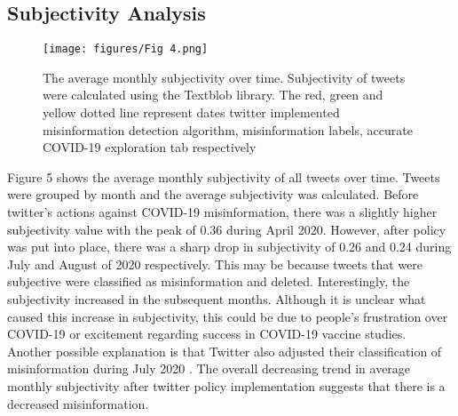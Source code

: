 \documentclass[10pt,twocolumn,letterpaper]{article}
\begin{document}
\subsection{Subjectivity Analysis}
\begin{figure}[H]
  \centering
  \texttt{[image: figures/Fig 4.png]}
  \caption{The average monthly subjectivity over time. Subjectivity of tweets were calculated using the Textblob library. The red, green and yellow dotted line represent dates twitter implemented misinformation detection algorithm, misinformation labels, accurate COVID-19 exploration tab respectively}
\end{figure}
Figure 5 shows the average monthly subjectivity of all tweets over time. Tweets were grouped by month and the average subjectivity was calculated. Before twitter’s actions against COVID-19 misinformation, there was a slightly higher subjectivity value with the peak of 0.36 during April 2020. However, after policy was put into place, there was a sharp drop in subjectivity of 0.26 and 0.24 during July and August of 2020 respectively. This may be because tweets that were subjective were classified as misinformation and deleted. Interestingly, the subjectivity increased in the subsequent months. Although it is unclear what caused this increase in subjectivity, this could be due to people’s frustration over COVID-19 or excitement regarding success in COVID-19 vaccine studies. Another possible explanation is that Twitter also adjusted their classification of misinformation during July 2020 \cite{inc._2021} . The overall decreasing trend in average monthly subjectivity after twitter policy implementation suggests that there is a decreased misinformation. 
\end{document}
